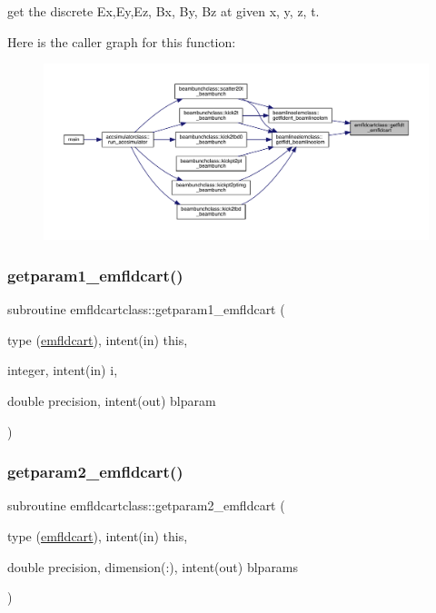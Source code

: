 get the discrete Ex,Ey,Ez, Bx, By, Bz at given x, y, z, t. 

Here is the caller graph for this function\+:\nopagebreak
\begin{figure}[H]
\begin{center}
\leavevmode
\includegraphics[width=350pt]{namespaceemfldcartclass_a63a14e90f4526aa45d3d28a9611d3908_icgraph}
\end{center}
\end{figure}
\mbox{\label{namespaceemfldcartclass_ab81f3e948555a34e9f3e6dd08fb8d7c8}} 
\subsubsection{\texorpdfstring{getparam1\_emfldcart()}{getparam1\_emfldcart()}}
{\footnotesize\ttfamily subroutine emfldcartclass\+::getparam1\+\_\+emfldcart (\begin{DoxyParamCaption}\item[{type (\mbox{\hyperlink{namespaceemfldcartclass_structemfldcartclass_1_1emfldcart}{emfldcart}}), intent(in)}]{this,  }\item[{integer, intent(in)}]{i,  }\item[{double precision, intent(out)}]{blparam }\end{DoxyParamCaption})}

\mbox{\label{namespaceemfldcartclass_a0e3252de98b5d0c5318b5cdccb878b21}} 
\subsubsection{\texorpdfstring{getparam2\_emfldcart()}{getparam2\_emfldcart()}}
{\footnotesize\ttfamily subroutine emfldcartclass\+::getparam2\+\_\+emfldcart (\begin{DoxyParamCaption}\item[{type (\mbox{\hyperlink{namespaceemfldcartclass_structemfldcartclass_1_1emfldcart}{emfldcart}}), intent(in)}]{this,  }\item[{double precision, dimension(\+:), intent(out)}]{blparams }\end{DoxyParamCaption})}

